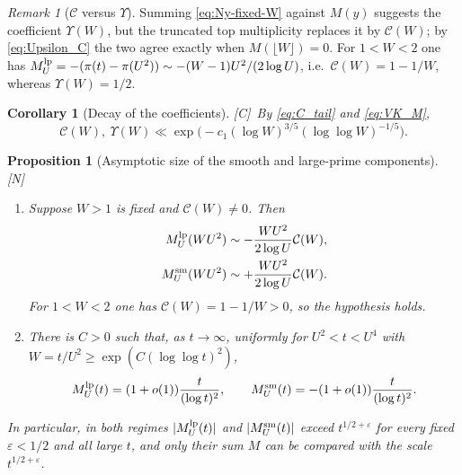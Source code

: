 \documentclass[11pt]{amsart}
\numberwithin{equation}{section}
\theoremstyle{plain}
\newtheorem{proposition}[theorem]{Proposition}
\newtheorem{corollary}[theorem]{Corollary}
\theoremstyle{definition}
\theoremstyle{remark}
\newtheorem{remark}[theorem]{Remark}
\newcommand{\eps}{\varepsilon}
\newcommand{\Cc}{\mathcal{C}}
\newcommand{\tagN}{\textup{[N]}}
\newcommand{\tagC}{\textup{[C]}}
\begin{document}
\begin{remark}[$\Cc$ versus $\Upsilon$]
\label{rem:C-vs-Upsilon}
Summing \eqref{eq:Ny-fixed-W} against $M(y)$ suggests the coefficient
$\Upsilon(W)$, but the truncated top multiplicity replaces it by $\Cc(W)$; by
\eqref{eq:Upsilon_C} the two agree exactly when $M(\lfloor W\rfloor)=0$. For
$1<W<2$ one has $M^{\rm lp}_U=-(\pi(t)-\pi(U^2))\sim-(W-1)U^2/(2\log U)$, i.e.\
$\Cc(W)=1-1/W$, whereas $\Upsilon(W)=1/2$.
\end{remark}

\begin{corollary}[Decay of the coefficients]
\label{cor:AR-VK}
\tagC\ By \eqref{eq:C_tail} and \eqref{eq:VK_M},
\begin{equation}
\label{eq:AR-VK}
  \Cc(W),\ \Upsilon(W)\ll\exp\bigl(-c_1(\log W)^{3/5}(\log\log W)^{-1/5}\bigr).
\end{equation}
\end{corollary}

\begin{proposition}[Asymptotic size of the smooth and large-prime components]
\label{prop:both_parts_large}
\tagN\ \begin{enumerate}[label=\textup{(\roman*)},leftmargin=*]
\item Suppose $W>1$ is fixed and $\Cc(W)\ne0$. Then
\begin{align}
\label{eq:E_fixed_W_size}
  M^{\rm lp}_U(WU^2)&\sim-\frac{WU^2}{2\log U}\Cc(W),\notag\\
  M^{\rm sm}_U(WU^2)&\sim+\frac{WU^2}{2\log U}\Cc(W).
\end{align}
For $1<W<2$ one has $\Cc(W)=1-1/W>0$, so the hypothesis holds.
\item There is $C>0$ such that, as $t\to\infty$, uniformly for $U^2<t<U^4$
with $W=t/U^2\ge\exp(C(\log\log t)^2)$,
\begin{equation}
\label{eq:E_log2}
  M^{\rm lp}_U(t)=(1+o(1))\frac{t}{(\log t)^2},\qquad
  M^{\rm sm}_U(t)=-(1+o(1))\frac{t}{(\log t)^2}.
\end{equation}
\end{enumerate}
In particular, in both regimes $|M^{\rm lp}_U(t)|$ and $|M^{\rm sm}_U(t)|$ exceed
$t^{1/2+\eps}$ for every fixed $\eps<1/2$ and all large $t$, and only their
sum $M$ can be compared with the scale $t^{1/2+\eps}$.
\end{proposition}
\end{document}
